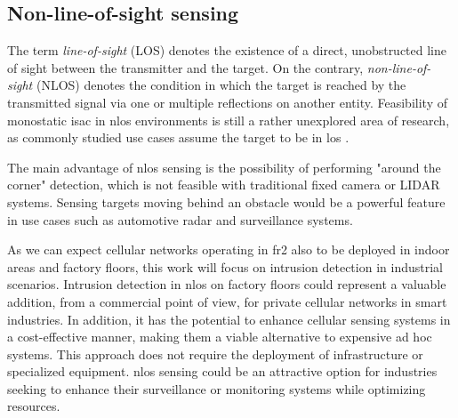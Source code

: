	
	\subsection{Non-line-of-sight sensing}
	
	
	
	The term \textit{line-of-sight} (LOS)  denotes the existence of a direct, unobstructed line of sight between the transmitter and the target. On the contrary, \textit{non-line-of-sight} (NLOS) denotes the condition in which the target is reached by the transmitted signal via one or multiple reflections on another entity. 
	Feasibility of monostatic \gls{isac} in \gls{nlos} environments is still a rather unexplored area of research, as commonly studied use cases assume the target to be in \gls{los} \cite{Gustaffson_NLOS_radar}.
	
	The main advantage of \gls{nlos} sensing is the possibility of performing "around the corner" detection, which is not feasible with traditional fixed camera or LIDAR systems. 
	Sensing targets moving behind an obstacle would be a powerful feature in use cases such as automotive radar and surveillance systems.
	
	As we can expect cellular networks operating in \gls{fr2} also to be deployed in indoor areas and factory floors, this work will focus on intrusion detection in industrial scenarios.
	Intrusion detection in \gls{nlos} on factory floors could represent a valuable addition, from a commercial point of view, for private cellular networks in smart industries.
	In addition, it has the potential to enhance cellular sensing systems in a cost-effective manner, making them a viable alternative to expensive ad hoc systems. This approach does not require the deployment of infrastructure or specialized equipment. 
	\gls{nlos} sensing could be an attractive option for industries seeking to enhance their surveillance or monitoring systems while optimizing resources.
	
	
	

